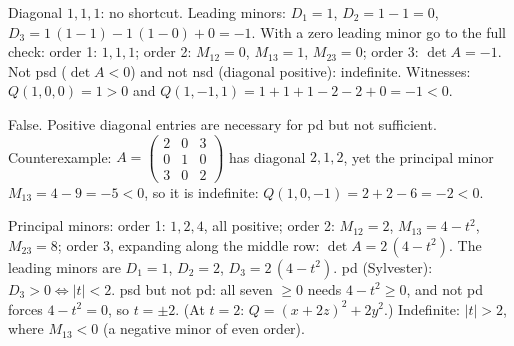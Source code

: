 \begin{solutions}
    \item Diagonal $1, 1, 1$: no shortcut. Leading minors: $D_{1} = 1$, $D_{2} = 1 - 1 = 0$, $D_{3} = 1\,(1 - 1) - 1\,(1 - 0) + 0 = -1$. With a zero leading minor go to the full check: order 1: $1, 1, 1$; order 2: $M_{12} = 0$, $M_{13} = 1$, $M_{23} = 0$; order 3: $\det A = -1$.
          Not psd ($\det A < 0$) and not nsd (diagonal positive): indefinite.
          Witnesses: $Q(1, 0, 0) = 1 > 0$ and $Q(1, -1, 1) = 1 + 1 + 1 - 2 - 2 + 0 = -1 < 0$.
    \item False. Positive diagonal entries are necessary for pd but not sufficient. Counterexample: $A = \begin{pmatrix} 2 & 0 & 3 \\ 0 & 1 & 0 \\ 3 & 0 & 2 \end{pmatrix}$ has diagonal $2, 1, 2$, yet the principal minor $M_{13} = 4 - 9 = -5 < 0$, so it is indefinite: $Q(1, 0, -1) = 2 + 2 - 6 = -2 < 0$.
    \item Principal minors: order 1: $1, 2, 4$, all positive; order 2: $M_{12} = 2$, $M_{13} = 4 - t^{2}$, $M_{23} = 8$; order 3, expanding along the middle row: $\det A = 2\,(4 - t^{2})$. The leading minors are $D_{1} = 1$, $D_{2} = 2$, $D_{3} = 2\,(4 - t^{2})$.
          pd (Sylvester): $D_{3} > 0 \Leftrightarrow |t| < 2$.
          psd but not pd: all seven $\ge 0$ needs $4 - t^{2} \ge 0$, and not pd forces $4 - t^{2} = 0$, so $t = \pm 2$. (At $t = 2$: $Q = (x + 2z)^{2} + 2 y^{2}$.)
          Indefinite: $|t| > 2$, where $M_{13} < 0$ (a negative minor of even order).
\end{solutions}
